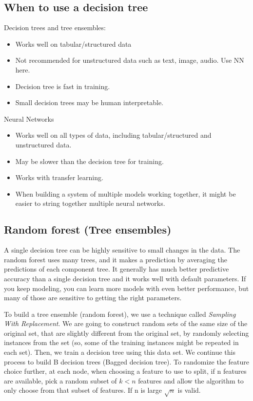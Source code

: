 \documentclass[12pt]{report}
\begin{document}
\subsection{When to use a decision tree}
Decision trees and tree ensembles:
\begin{itemize}
  \item Works well on tabular/structured data
  \item Not recommended for unstructured data such as text, image, audio. Use NN here.
  \item Decision tree is fast in training.
  \item Small decision trees may be human interpretable.
\end{itemize}
Neural Networks
\begin{itemize}
  \item Works well on all types of data, including tabular/structured and unstructured data.
  \item May be slower than the decision tree for training.
  \item Works with transfer learning.
  \item When building a system of multiple models working together, it might be easier to string together multiple neural networks.
\end{itemize}


\subsection{Random forest (Tree ensembles)}
\label{sec:forest}
A single decision tree can be highly sensitive to small changes in the data.
The random forest uses many trees, and it makes a prediction by averaging the predictions of each component tree. It generally has much better predictive accuracy than a single decision tree and it works well with default parameters. If you keep modeling, you can learn more models with even better performance, but many of those are sensitive to getting the right parameters.

To build a tree ensemble (random forest), we use a technique called \textit{Sampling With Replacement}. We are going to construct random sets of the same size of the original set, that are slightly different from the original set, by randomly selecting instances from the set (so, some of the training instances might be repeated in each set). Then, we train a decision tree using this data set. We continue this process to build B decision trees (Bagged decision tree). To randomize the feature choice further, at each node, when choosing a feature to use to split, if n features are available, pick a random subset of $k<n$ features and allow the algorithm to only choose from that subset of features. If n is large $\sqrt{n}$ is valid.
\end{document}
